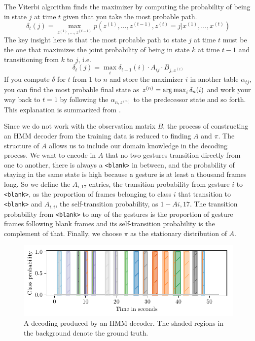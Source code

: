The Viterbi algorithm finds the maximizer by computing the probability of being
in state $j$ at time $t$ given that you take the most probable path.
\begin{equation*}
  \delta_{t}(j) = \max_{z^{(1)}, \dots, z^{(t - 1)}} p(z^{(1)}, \dots, z^{(t - 1)}, z^{(t)} = j | x^{(1)}, \dots, x^{(t)})
\end{equation*}
The key insight here is that the most probable path to state $j$ at time $t$
must be the one that maximizes the joint probability of being in state $k$ at
time $t - 1$ and transitioning from $k$ to $j$, i.e.
\begin{equation*}
  \delta_{t}(j) = \max_{i} \delta_{t - 1}(i) \cdot A_{ij} \cdot B_{j,x^{(t)}}
\end{equation*}
If you compute $\delta$ for $t$ from 1 to $n$ and store the maximizer $i$ in
another table $\alpha_{tj}$, you can find the most probable final state as
$z^{(n)} = \operatorname*{arg\,max}_{i} \delta_{n}(i)$ and work your way back to $t = 1$ by
following the $\alpha_{n,z^{(n)}}$ to the predecessor state and so forth.
This explanation is summarized from \cite{murphy12}.

Since we do not work with the observation matrix $B$, the process of
constructing an HMM decoder from the training data is reduced to finding $A$ and
$\pi$. The structure of $A$ allows us to include our domain knowledge in the
decoding process. We want to encode in $A$ that no two gestures transition
directly from one to another, there is always a \texttt{<blank>} in between, and
the probability of staying in the same state is high because a gesture is at
least a thousand frames long. So we define the $A_{i,17}$ entries, the
transition probability from gesture $i$ to \texttt{<blank>}, as the proportion
of frames belonging to class $i$ that transition to \texttt{<blank>} and
$A_{i,i}$, the self-transition probability, as $1 - A{i,17}$. The transition
probability from \texttt{<blank>} to any of the gestures is the proportion of
gesture frames following blank frames and its self-transition probability is the
complement of that. Finally, we choose $\pi$ as the stationary distribution of
$A$.

\begin{figure}
  \centering
  \includegraphics{figures/methods/decoded}
  \caption{A decoding produced by an HMM decoder. The shaded regions in the
    background denote the ground truth.}
  \label{fig:decoded}
\end{figure}

